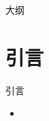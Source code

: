 \documentclass{beamer}
\title{}
\author{}
\date{\today}
\begin{document}
\begin{frame}
  \titlepage
\end{frame}

\begin{frame}{大纲}
  \tableofcontents
\end{frame}

\section{引言}

\begin{frame}{引言}
  \begin{itemize}
    \item
  \end{itemize}
\end{frame}
\end{document}
